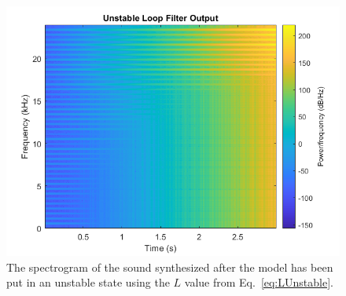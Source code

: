 \documentclass[../main.tex]{subfiles}
\begin{document}
\begin{figure}[h]
    \centering
    \includegraphics[scale=.65]{./images/plots/UnstableLoopFilter.png}
    \caption{The spectrogram of the sound synthesized after the model has been put in an unstable state using the $L$ value from Eq.~\ref{eq:LUnstable}.}
    \label{fig:UnstableLoop}
\end{figure}
\end{document}
